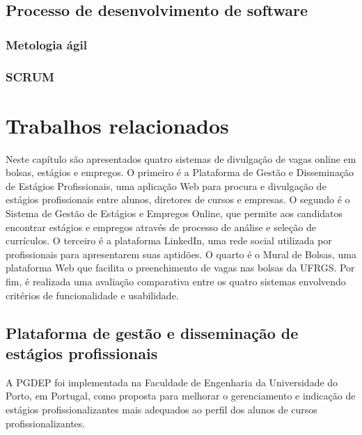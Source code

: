 \documentclass[cic,tc]{iiufrgs}
\begin{document}
\section{Processo de desenvolvimento de software}

\subsection{Metologia ágil}
\label{fundSWAgil}
\subsection{SCRUM}
\label{fundSWSCRUM}



\chapter{Trabalhos relacionados}

Neste capítulo são apresentados quatro sistemas de divulgação de vagas online em bolsas, estágios e empregos. O primeiro é a Plataforma de Gestão e Disseminação de Estágios Profissionais, uma aplicação Web para procura e divulgação de estágios profissionais entre alunos, diretores de cursos e empresas. O segundo é o Sistema de Gestão de Estágios e Empregos Online, que permite aos candidatos encontrar estágios e empregos através de processo de análise e seleção de currículos. O terceiro é a plataforma LinkedIn, uma rede social utilizada por profissionais para apresentarem suas aptidões. O quarto é o Mural de Bolsas, uma plataforma Web que facilita o preenchimento de vagas nas bolsas da UFRGS. Por fim, é realizada uma avaliação comparativa entre os quatro sistemas envolvendo critérios de funcionalidade e usabilidade.

\section{Plataforma de gestão e disseminação de estágios profissionais}
\label{trabRelPlatGestao}

A PGDEP \cite{PGDEPMono} foi implementada na Faculdade de Engenharia da Universidade do Porto, em Portugal, como proposta para melhorar o gerenciamento e indicação de estágios profissionalizantes mais adequados ao perfil dos alunos de cursos profissionalizantes. 
\end{document}
